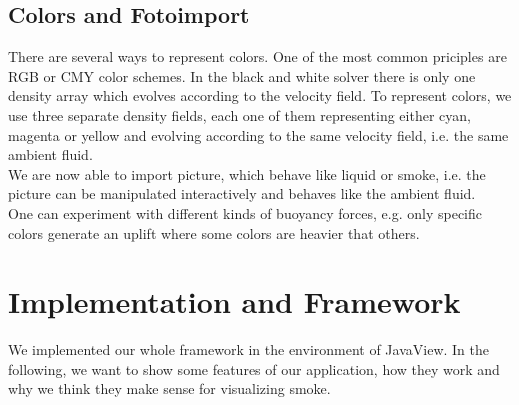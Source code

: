\documentclass[a4paper,10pt,oneside,final,german,openbib,pdftex,titlepage]{scrbook}
\begin{document}
\section{Colors and Fotoimport}
There are several ways to represent colors. One of the most common priciples are RGB or CMY color schemes. In the black and white solver there is only one density array which evolves according to the velocity field. To represent colors, we use three separate density fields, each one of them representing either cyan, magenta or yellow and evolving according to the same velocity field, i.e. the same \grqq ambient fluid\grqq.\\
We are now able to import picture, which behave like liquid or smoke, i.e. the picture can be manipulated interactively and behaves like the ambient fluid.\\
One can experiment with different kinds of buoyancy forces, e.g. only specific colors generate an uplift where some colors are heavier that others. 

\chapter{Implementation and Framework}
We implemented our whole framework in the environment of JavaView. In the following, we want to show some features of our application, how they work and why we think they make sense for visualizing smoke.
%
\end{document}
